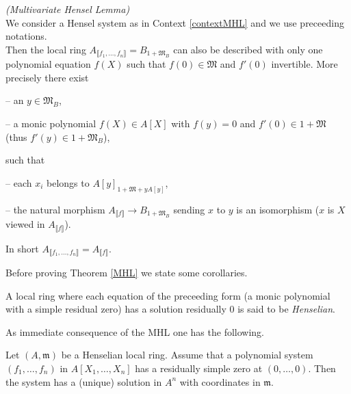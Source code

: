 \documentclass[11pt,a4paper,twoside]{article}
\newcommand{\gothic}{\mathfrak}
\newcommand{\fm}{{\gothic m}}
\newcommand{\fM}{{\gothic M}}
\newcommand\lrb[1] {\llbracket #1 \rrbracket}
\newcommand\Af {{A_{\lrb f}}}
\newcommand\Afn {A_{\lrb{f_1,\dots,f_n}}}
\begin{document}
\begin{theorem} \label{MHL} \emph{(Multivariate Hensel Lemma)}\\
We consider a Hensel system as in Context \ref{contextMHL} and we use preceeding  notations.\\
Then the local ring $\Afn=B_{1+\fM_B}$ can also be described with only one polynomial equation $f(X)$ such that $f(0)\in\fM$ and $f'(0)$ invertible.
 More precisely there exist

\smallskip \noindent  -- an $y\in \fM_B$,

\smallskip \noindent  --  a monic polynomial $f(X)\in A[X]$
with $f(y)=0$ and $f'(0)\in 1+\fM$ (thus $f'(y) \in  1+\fM_B$), 

\smallskip \noindent such that  

\smallskip \noindent  --  each $x_i$ belongs to $A[y]_{1+\fM+yA[y]}$,

\smallskip \noindent  -- 
the natural morphism
$\Af\to B_{1+\fM_B}$ sending $x$ to $y$ is an isomorphism ($x$ is $X$ viewed in $\Af$).

\smallskip \noindent 
In short $\Afn=A_{\lrb{f}}$. 
\end{theorem}

Before proving Theorem \ref{MHL} we state some corollaries.


A local ring  where each equation of the preceeding form
(a monic polynomial with a simple residual zero) has
a solution residually $0$ is said to be \emph{Henselian}. 

As immediate consequence of the MHL one has the following.
\begin{corollary} \label{corMHL}
Let  $(A,\fm)$ be a Henselian local ring. Assume that a polynomial
system
$(f_1 , \dots , f_n)$ in $A[X_1,\dots,X_n]$
has a residually simple zero at $(0,\dots,0)$. Then the system has a (unique) solution in $A^{n}$ with coordinates in $\fm$.
\end{corollary}

  
\end{document}
